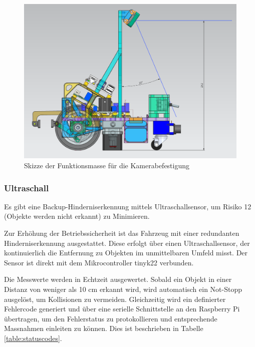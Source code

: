  \begin{figure}[H]
\centering
\includegraphics[width= \textwidth ]{assets/MT/Sichtfeld_Roboter.png}
\caption{Skizze der Funktionsmasse für die Kamerabefestigung}
\label{fig:Skizze der Funktionsmasse für die Kamerabefestigung}
\end{figure}


\subsubsection{Ultraschall}
\label{ultraschall}

Es gibt eine Backup-Hinderniserkennung mittels Ultraschallsensor, um Risiko 12 (Objekte werden nicht erkannt) zu Minimieren.

Zur Erhöhung der Betriebssicherheit ist das Fahrzeug mit einer redundanten Hinderniserkennung ausgestattet. Diese erfolgt über einen Ultraschallsensor, der kontinuierlich die Entfernung zu Objekten im unmittelbaren Umfeld misst. Der Sensor ist direkt mit dem Mikrocontroller \gls{tinyk22} verbunden.

Die Messwerte werden in Echtzeit ausgewertet. Sobald ein Objekt in einer Distanz von weniger als 10 cm erkannt wird, wird automatisch ein Not-Stopp ausgelöst, um Kollisionen zu vermeiden. Gleichzeitig wird ein definierter Fehlercode generiert und über eine serielle Schnittstelle an den Raspberry Pi übertragen, um den Fehlerstatus zu protokollieren und entsprechende Massnahmen einleiten zu können. Dies ist beschrieben in Tabelle \ref{table:statuscodes}.







